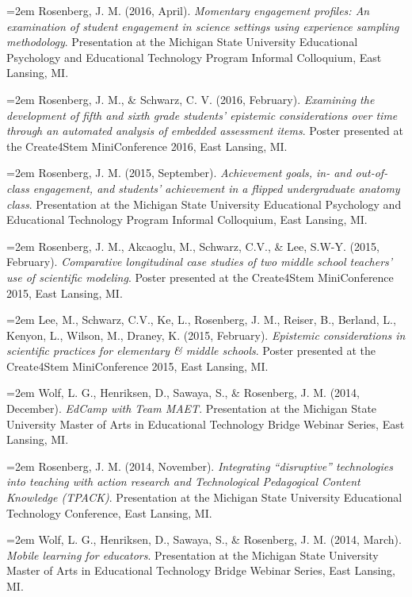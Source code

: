 \documentclass[
  11pt,
]{article}
\begin{document}
\hangindent=2em Rosenberg, J. M. (2016, April). \emph{Momentary
engagement profiles: An examination of student engagement in science
settings using experience sampling methodology}. Presentation at the
Michigan State University Educational Psychology and Educational
Technology Program Informal Colloquium, East Lansing, MI.

\hangindent=2em Rosenberg, J. M., \& Schwarz, C. V. (2016, February).
\emph{Examining the development of fifth and sixth grade students'
epistemic considerations over time through an automated analysis of
embedded assessment items}. Poster presented at the Create4Stem
MiniConference 2016, East Lansing, MI.

\hangindent=2em Rosenberg, J. M. (2015, September). \emph{Achievement
goals, in- and out-of-class engagement, and students' achievement in a
flipped undergraduate anatomy class}. Presentation at the Michigan State
University Educational Psychology and Educational Technology Program
Informal Colloquium, East Lansing, MI.

\hangindent=2em Rosenberg, J. M., Akcaoglu, M., Schwarz, C.V., \& Lee,
S.W-Y. (2015, February). \emph{Comparative longitudinal case studies of
two middle school teachers' use of scientific modeling}. Poster
presented at the Create4Stem MiniConference 2015, East Lansing, MI.

\hangindent=2em Lee, M., Schwarz, C.V., Ke, L., Rosenberg, J. M.,
Reiser, B., Berland, L., Kenyon, L., Wilson, M., Draney, K. (2015,
February). \emph{Epistemic considerations in scientific practices for
elementary \& middle schools}. Poster presented at the Create4Stem
MiniConference 2015, East Lansing, MI.

\hangindent=2em Wolf, L. G., Henriksen, D., Sawaya, S., \& Rosenberg, J.
M. (2014, December). \emph{EdCamp with Team MAET}. Presentation at the
Michigan State University Master of Arts in Educational Technology
Bridge Webinar Series, East Lansing, MI.

\hangindent=2em Rosenberg, J. M. (2014, November). \emph{Integrating
``disruptive'' technologies into teaching with action research and
Technological Pedagogical Content Knowledge (TPACK)}. Presentation at
the Michigan State University Educational Technology Conference, East
Lansing, MI.

\hangindent=2em Wolf, L. G., Henriksen, D., Sawaya, S., \& Rosenberg, J.
M. (2014, March). \emph{Mobile learning for educators}. Presentation at
the Michigan State University Master of Arts in Educational Technology
Bridge Webinar Series, East Lansing, MI.
\end{document}
